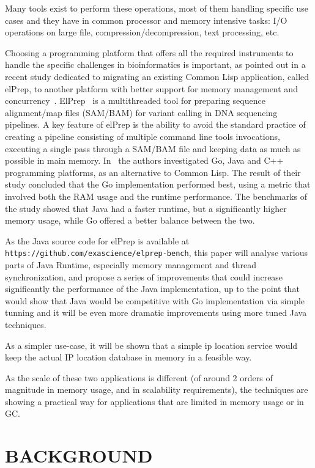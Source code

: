 \documentclass[a4paper,twoside]{article}
\begin{document}
Many tools exist to perform these operations, most of them handling specific use cases and they have in common processor and memory intensive tasks: I/O operations on large file,
compression/decompression, text processing, etc.

Choosing a programming platform that offers all the required instruments to handle the specific challenges in
bioinformatics is important,
as pointed out in a recent study dedicated to migrating an existing Common Lisp application, called elPrep, 
to another platform with better support for memory management and concurrency~\cite{costanza:2019}.
ElPrep~\cite{herzeel:2019} is a multithreaded tool for preparing sequence alignment/map files (SAM/BAM)
for variant calling in DNA sequencing pipelines. 
A key feature of elPrep is the ability to avoid the standard practice of creating a pipeline consisting of multiple
command line tools invocations,
executing a single pass through a SAM/BAM file and keeping data as much as possible in main memory.
In~\cite{costanza:2019} the authors investigated Go, Java and C++ programming platforms, as an alternative to Common Lisp.
The result of their study concluded that the Go implementation performed best, using a metric that involved both the
RAM usage and the runtime performance.
The benchmarks of the study showed that Java had a faster runtime, but a significantly higher memory usage, while Go
offered a better balance between the two.

As the Java source code for elPrep is available at {\texttt{https://github.com/exascience/elprep-bench}}, this paper will
analyse various parts of Java Runtime, especially memory management and thread synchronization, and propose a series of improvements
that could increase significantly the performance of the Java implementation, up to the point that would show that Java would be
competitive with Go implementation via simple tunning and it will be even more dramatic improvements using more tuned Java techniques.

As a simpler use-case, it will be shown that  a simple ip location service would keep the actual IP location database in memory in a feasible way.

As the scale of these two applications is different (of around 2 orders of magnitude in memory usage, and in scalability requirements),
the techniques are showing a practical way for applications that are limited in memory usage or in GC.


\section{\uppercase{Background}}
\label{background}
\end{document}
